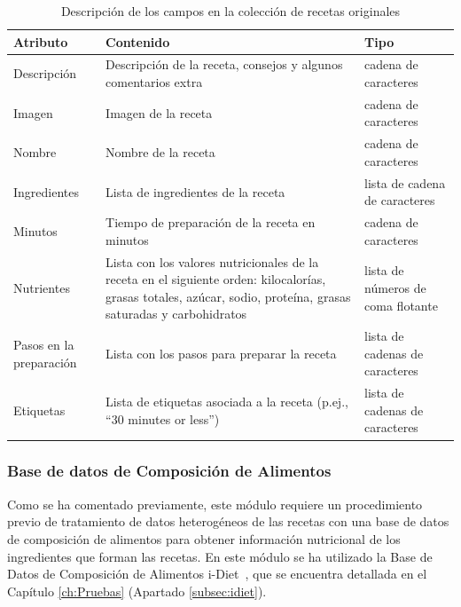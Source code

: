 \setlength{\tabcolsep}{2pt} 
\begin{table}[H]
\begin{tabular}{p{}|p{}|p{}}
\textbf{Atributo} & \textbf{Contenido} & \textbf{Tipo} \\ \hline 
Descripción & Descripción de la receta, consejos y algunos comentarios extra & cadena de caracteres \\
Imagen & Imagen de la receta & cadena de caracteres \\
Nombre & Nombre de la receta & cadena de caracteres \\
Ingredientes & Lista de ingredientes de la receta & lista de cadena de caracteres \\
Minutos & Tiempo de preparación de la receta en minutos & cadena de caracteres \\
Nutrientes & Lista con los valores nutricionales de la receta en el siguiente orden: kilocalorías, grasas totales, azúcar, sodio, proteína, grasas saturadas y carbohidratos & lista de números de coma flotante \\
Pasos en la preparación & Lista con los pasos para preparar la receta & lista de cadenas de caracteres \\
Etiquetas & Lista de etiquetas asociada a la receta (p.ej., ``30 minutes or less'') & lista de cadenas de caracteres
\end{tabular}
\caption{\label{table:ejemplo_receta} Descripción de los campos en la colección de recetas originales}
\end{table}


\subsubsection{Base de datos de Composición de Alimentos}

Como se ha comentado previamente, este módulo requiere un procedimiento previo de tratamiento de datos heterogéneos de las recetas con una base de datos de composición de alimentos para obtener información nutricional de los ingredientes que forman las recetas. En este módulo se ha utilizado la Base de Datos de Composición de Alimentos i-Diet~\cite{iDietrf}, que se encuentra detallada en el Capítulo \ref{ch:Pruebas} (Apartado \ref{subsec:idiet}). 

